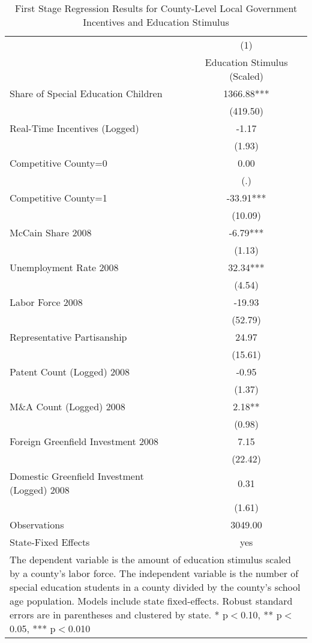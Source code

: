 \begin{table}[!htbp]\centering
\def\sym#1{\ifmmode^{#1}\else\(^{#1}\)\fi}
\caption{First Stage Regression Results for County-Level Local Government Incentives and Education Stimulus}
\begin{tabular}{l*{1}{c}}
\hline\hline
                    &\multicolumn{1}{c}{(1)}   \\
                    &Education Stimulus (Scaled)   \\
\hline
Share of Special Education Children&     1366.88***\\
                    &    (419.50)   \\
Real-Time Incentives (Logged)&       -1.17   \\
                    &      (1.93)   \\
Competitive County=0&        0.00   \\
                    &         (.)   \\
Competitive County=1&      -33.91***\\
                    &     (10.09)   \\
McCain Share 2008   &       -6.79***\\
                    &      (1.13)   \\
Unemployment Rate 2008 &       32.34***\\
                    &      (4.54)   \\
Labor Force 2008    &      -19.93   \\
                    &     (52.79)   \\
Representative Partisanship&       24.97   \\
                    &     (15.61)   \\
Patent Count (Logged) 2008&       -0.95   \\
                    &      (1.37)   \\
M\&A Count (Logged) 2008&        2.18** \\
                    &      (0.98)   \\
Foreign Greenfield Investment 2008&        7.15   \\
                    &     (22.42)   \\
Domestic Greenfield Investment (Logged) 2008&        0.31   \\
                    &      (1.61)   \\
\hline
Observations        &     3049.00   \\
State-Fixed Effects &         yes   \\
\hline\hline
\multicolumn{2}{p{\linewidth}}{\footnotesize The dependent variable is the amount of education stimulus scaled by a county's labor force. The independent variable is the number of special education students in a county divided by the county's school age population. Models include state fixed-effects. Robust standard errors are in parentheses and clustered by state. * p$<$0.10, ** p$<$0.05, *** p$<$0.010}\\
\end{tabular}
\end{table}
